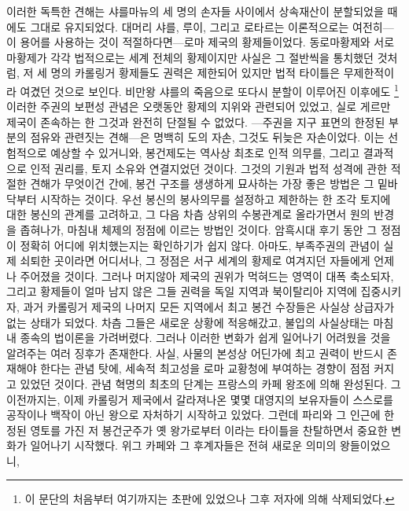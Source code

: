 이러한 독특한 견해는 샤를마뉴의 세 명의 손자들 사이에서
상속재산이 분할되었을 때에도 그대로 유지되었다.
대머리 샤를, 루이, 그리고 로타르는 이론적으로는 여전히---이 용어를
사용하는 것이 적절하다면---로마 제국의 황제들이었다.
동로마황제와 서로마황제가 각각 법적으로는 세계 전체의 황제이지만
사실은 그 절반씩을 통치했던 것처럼,
저 세 명의 카롤링거 황제들도 권력은 제한되어 있지만
법적 타이틀은 무제한적이라 여겼던 것으로 보인다.
비만왕 샤를의 죽음으로 또다시 분할이 이루어진 이후에도
\footnote{이 문단의 처음부터 여기까지는 초판에 있었으나 그후 저자에 의해 삭제되었다.}
이러한 주권의 보편성 관념은
오랫동안 황제의 지위와 관련되어 있었고,
실로 게르만 제국이 존속하는 한 그것과 완전히 단절될 수 없었다.
---주권을 지구 표면의 한정된 부분의 점유와 관련짓는 견해---은
명백히 도의 자손, 그것도 뒤늦은 자손이었다.
이는 선험적으로 예상할 수 있거니와,
봉건제도는 역사상 최초로 인적 의무를, 그리고 결과적으로
인적 권리를, 토지 소유와 연결지었던 것이다.
그것의 기원과 법적 성격에 관한 적절한 견해가 무엇이건 간에,
봉건 구조를 생생하게 묘사하는 가장 좋은 방법은
그 밑바닥부터 시작하는 것이다.
우선 봉신의 봉사의무를 설정하고 제한하는 한 조각 토지에 대한
봉신의 관계를 고려하고,
그 다음 차츰 상위의 수봉관계로 올라가면서 원의 반경을 좁혀나가,
마침내 체제의 정점에 이르는 방법인 것이다.
암흑시대 후기 동안 그 정점이 정확히 어디에 위치했는지는 확인하기가 쉽지 않다.
아마도, 부족주권의 관념이 실제 쇠퇴한 곳이라면 어디서나,
그 정점은 서구 세계의 황제로 여겨지던 자들에게 언제나 주어졌을 것이다.
그러나 머지않아 제국의 권위가 먹혀드는 영역이 대폭 축소되자,
그리고 황제들이 얼마 남지 않은 그들 권력을
독일 지역과 북이탈리아 지역에 집중시키자,
과거 카롤링거 제국의 나머지 모든 지역에서 최고 봉건 수장들은 사실상
상급자가 없는 상태가 되었다.
차츰 그들은 새로운 상황에 적응해갔고,
불입의 사실상태는
마침내 종속의 법이론을 가려버렸다.
그러나 이러한 변화가 쉽게 일어나기 어려웠을 것을 알려주는 여러 징후가 존재한다.
사실, 사물의 본성상 어딘가에 최고 권력이 반드시 존재해야 한다는 관념 탓에,
세속적 최고성을 로마 교황청에 부여하는 경향이 점점 커지고 있었던 것이다.
관념 혁명의 최초의 단계는
프랑스의 카페 왕조에 의해 완성된다.
그 이전까지는,
이제 카롤링거 제국에서 갈라져나온 몇몇 대영지의 보유자들이
스스로를 공작이나 백작이 아닌 왕으로 자처하기 시작하고 있었다.
그런데 파리와 그 인근에 한정된 영토를 가진 저 봉건군주가
옛 왕가로부터 이라는 타이틀을 찬탈하면서
중요한 변화가 일어나기 시작했다.
위그 카페와 그 후계자들은 전혀 새로운 의미의 왕들이었으니,
